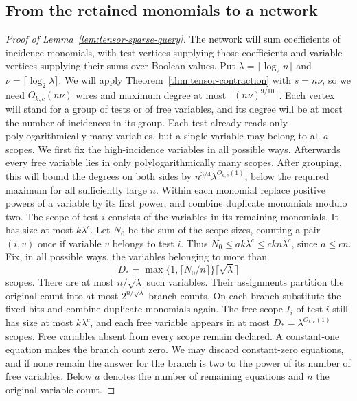 \subsection{From the retained monomials to a network}\label{subsec:tensor-sparse-proof}
\begin{proof}[Proof of Lemma~\ref{lem:tensor-sparse-query}]
The network will sum coefficients of incidence monomials, with
test vertices supplying those coefficients and variable vertices
supplying their sums over Boolean values.
Put $\lambda=\lceil\log_2 n\rceil$ and
$\nu=\lceil\log_2\lambda\rceil$.
We will apply Theorem~\ref{thm:tensor-contraction} with $s=n\nu$,
so we need $O_{k,c}(n\nu)$ wires and maximum degree at most
$\lceil(n\nu)^{9/10}\rceil$. Each vertex will stand for a
group of tests or of free variables, and its degree will be at most the
number of incidences in its group. Each test already reads only
polylogarithmically many variables, but a single variable may belong to
all $a$ scopes. We first fix the high-incidence variables in all
possible ways. Afterwards every free variable lies in only
polylogarithmically many scopes. After grouping, this will bound the
degrees on both sides by $n^{3/4}\lambda^{O_{k,c}(1)}$, below the
required maximum for all sufficiently large $n$.
Within each monomial replace positive powers of a variable by its
first power, and combine duplicate monomials modulo two. The scope
of test $i$ consists of the variables in its remaining monomials.
It has size at most $k\lambda^c$.
Let $N_0$ be the sum of the scope sizes, counting a pair $(i,v)$
once if variable $v$ belongs to test $i$. Thus $N_0\le ak\lambda^c\le ckn\lambda^c$, since $a\le cn$.
Fix, in all possible ways, the variables belonging to more than
\[
 D_*=\max\{1,\lceil N_0/n\rceil\}\lceil\sqrt{\lambda}\rceil
\]
scopes. There are at most $n/\sqrt{\lambda}$ such variables. Their
assignments partition the original count into at most
$2^{n/\sqrt{\lambda}}$ branch counts. On each branch substitute the
fixed bits and combine duplicate monomials again. The free scope
$I_i$ of test $i$ still has size at most $k\lambda^c$, and each free
variable appears in at most $D_*=\lambda^{O_{k,c}(1)}$ scopes. Free
variables absent from every scope remain declared. A constant-one
equation makes the branch count zero. We may discard constant-zero
equations, and if none remain the answer for the branch is two to the
power of its number of free variables. Below $a$ denotes the number
of remaining equations and $n$ the original variable count.


\end{proof}
